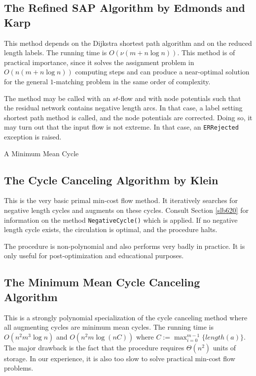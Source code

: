 \documentclass[a4paper,11pt,twoside]{book}
\begin{document}
\begin{multicols}{2}
\subsection{The Refined SAP Algorithm by Edmonds and Karp}
This method depends on the Dijkstra shortest path algorithm and on the reduced
length labels. The running time is $O(\nu(m+n\log{n}))$. This method is of
practical importance, since it solves the assignment problem in $O(n(m+n\log{n}))$
computing steps and can produce a near-optimal solution for the general
$1$-matching problem in the same order of complexity.

The method may be called with an $st$-flow and with node potentials such that
the residual network contains negative length arcs. In that case, a label
setting shortest path method is called, and the node potentials are corrected.
Doing so, it may turn out that the input flow is not extreme. In that case, an
\verb/ERRejected/ exception is raised.


\bigskip
\begin{figurehere}
\begin{center}
\epsfxsize=8cm
\vspace{0.5cm}
\caption{\label{flb_minmean}A Minimum Mean Cycle}
\end{center}
\end{figurehere}


\subsection{The Cycle Canceling Algorithm by Klein}
This is the very basic primal min-cost flow method. It iteratively searches for
negative length cycles and augments on these cycles. Consult Section
\ref{slb620} for information on the method \verb/NegativeCycle()/ which
is applied. If no negative length cycle exists, the circulation is optimal,
and the procedure halts.

The procedure is non-polynomial and also performs very badly in practice. It
is only useful for post-optimization and educational purposes.


\subsection{The Minimum Mean Cycle Canceling Algorithm}
This is a strongly polynomial specialization of the cycle canceling method
where all augmenting cycles are minimum mean cycles. The running time is
$O(n^2m^3\log{n})$ and $O(n^2m\log{(nC)})$ where
$C:=\max_{i=0}^{m-1}\{length(a)\}$.
The major drawback is the fact that the procedure requires $\Theta(n^2)$
units of storage. In our experience, it is also too slow to solve practical
min-cost flow problems.



\end{multicols}
\end{document}
